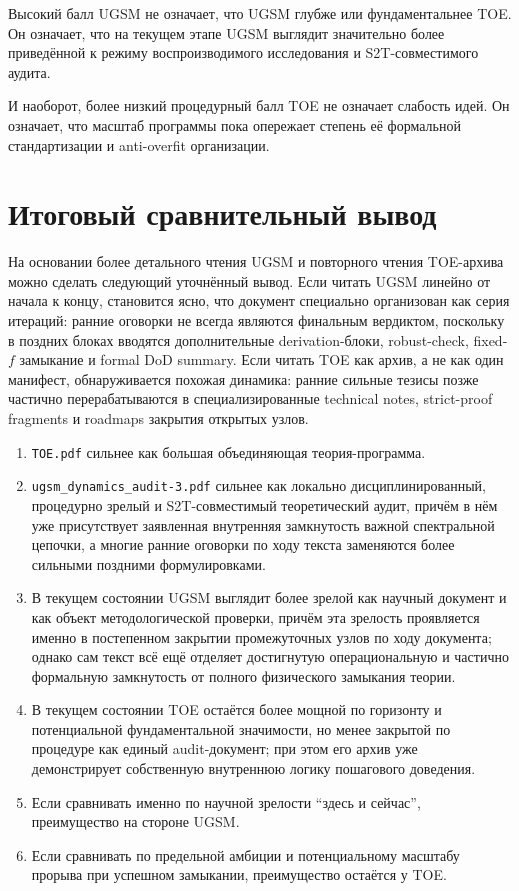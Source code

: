 \documentclass[12pt,a4paper]{article}
\begin{document}
Высокий балл UGSM не означает, что UGSM глубже или фундаментальнее TOE. Он означает, что на текущем этапе UGSM выглядит значительно более приведённой к режиму воспроизводимого исследования и S2T-совместимого аудита.

И наоборот, более низкий процедурный балл TOE не означает слабость идей. Он означает, что масштаб программы пока опережает степень её формальной стандартизации и anti-overfit организации.

\section{Итоговый сравнительный вывод}

На основании более детального чтения UGSM и повторного чтения TOE-архива можно сделать следующий уточнённый вывод. Если читать UGSM линейно от начала к концу, становится ясно, что документ специально организован как серия итераций: ранние оговорки не всегда являются финальным вердиктом, поскольку в поздних блоках вводятся дополнительные derivation-блоки, robust-check, fixed-$f$ замыкание и formal DoD summary. Если читать TOE как архив, а не как один манифест, обнаруживается похожая динамика: ранние сильные тезисы позже частично перерабатываются в специализированные technical notes, strict-proof fragments и roadmaps закрытия открытых узлов.

\begin{enumerate}
    \item \texttt{TOE.pdf} сильнее как большая объединяющая теория-программа.
    \item \texttt{ugsm\_dynamics\_audit-3.pdf} сильнее как локально дисциплинированный, процедурно зрелый и S2T-совместимый теоретический аудит, причём в нём уже присутствует заявленная внутренняя замкнутость важной спектральной цепочки, а многие ранние оговорки по ходу текста заменяются более сильными поздними формулировками.
    \item В текущем состоянии UGSM выглядит более зрелой как научный документ и как объект методологической проверки, причём эта зрелость проявляется именно в постепенном закрытии промежуточных узлов по ходу документа; однако сам текст всё ещё отделяет достигнутую операциональную и частично формальную замкнутость от полного физического замыкания теории.
    \item В текущем состоянии TOE остаётся более мощной по горизонту и потенциальной фундаментальной значимости, но менее закрытой по процедуре как единый audit-документ; при этом его архив уже демонстрирует собственную внутреннюю логику пошагового доведения.
    \item Если сравнивать именно по научной зрелости ``здесь и сейчас'', преимущество на стороне UGSM.
    \item Если сравнивать по предельной амбиции и потенциальному масштабу прорыва при успешном замыкании, преимущество остаётся у TOE.
\end{enumerate}
\end{document}
